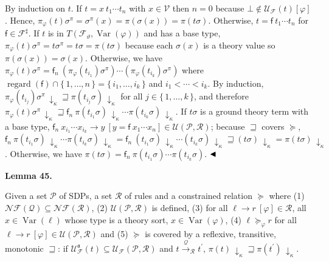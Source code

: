 \documentclass[10pt,a4paper]{amsart}
\begin{document}
By induction on $t$. If $t={x}\ {{t}_{1}\cdots{t}_{n}}$ with $x\in\mathcal{V}$ then $n=0$ because $\bot\notin\mathcal{U}_{\mathcal{F}}(t)[\varphi]$. Hence, $\pi_{\varphi}(t)\sigma^{\pi}=\sigma^{\pi}(x)=\pi(\sigma(x))=\pi(t\sigma)$. Otherwise, $t={\mathsf{f}}\ {{t}_{1}\cdots{t}_{n}}$ for $\mathsf{f}\in\mathcal{F}^{\sharp}$. If $t$ is in $T({\mathcal{F}}_{\vartheta},\operatorname{Var}(\varphi))$ and has a base type, $\pi_{\varphi}(t)\sigma^{\pi}=t\sigma^{\pi}=t\sigma=\pi(t\sigma)$ because each $\sigma(x)$ is a theory value so $\pi(\sigma(x))=\sigma(x)$. Otherwise, we have $\pi_{\varphi}(t)\sigma^{\pi}={\mathsf{f}_{n}}\ {(\pi_{\varphi}(t_{i_{1}})\sigma^{\pi})\cdots(\pi_{\varphi}(t_{i_{k}})\sigma^{\pi})}$ where $\operatorname{regard}(\mathsf{f})\cap\{\,1,\ldots,n\,\}=\{\,{i}_{1},\ldots,{i}_{k}\,\}$ and ${i}_{1}<\cdots<{i}_{k}$. By induction, $\pi_{\varphi}(t_{i_{j}})\sigma^{\pi}\,{\downarrow}_{\kappa}\sqsupseteq\pi(t_{i_{j}}\sigma)\,{\downarrow}_{\kappa}$ for all $j\in\{\,1,\ldots,k\,\}$, and therefore $\pi_{\varphi}(t)\sigma^{\pi}\,{\downarrow}_{\kappa}\sqsupseteq{\mathsf{f}_{n}}\ {\pi(t_{i_{1}}\sigma)\,{\downarrow}_{\kappa}\cdots\pi(t_{i_{k}}\sigma)\,{\downarrow}_{\kappa}}$. If $t\sigma$ is a ground theory term with a base type, ${{\mathsf{f}_{n}}\ {x_{i_{1}}\cdots x_{i_{k}}}}\rightarrow{y}\ [y={\mathsf{f}}\ {{x}_{1}\cdots{x}_{n}}]\in\mathcal{U}(\mathcal{P},\mathcal{R})$; because $\sqsupseteq$ covers $\succeq$, ${\mathsf{f}_{n}}\ {\pi(t_{i_{1}}\sigma)\,{\downarrow}_{\kappa}\cdots\pi(t_{i_{k}}\sigma)\,{\downarrow}_{\kappa}}={\mathsf{f}_{n}}\ {(t_{i_{1}}\sigma)\,{\downarrow}_{\kappa}\cdots(t_{i_{k}}\sigma)\,{\downarrow}_{\kappa}}\sqsupseteq(t\sigma)\,{\downarrow}_{\kappa}=\pi(t\sigma)\,{\downarrow}_{\kappa}$. Otherwise, we have $\pi(t\sigma)={\mathsf{f}_{n}}\ {\pi(t_{i_{1}}\sigma)\cdots\pi(t_{i_{k}}\sigma)}$. $\hfill\blacktriangleleft$\par
 
 
 
\par\medskip\noindent\textbf{Lemma 45.}\par
 
 
Given a set $\mathcal{P}$ of SDPs, a set $\mathcal{R}$ of rules and a constrained relation $\succeq$ where (1) $\mathcal{N}\!\mathcal{F}(\mathcal{Q})\subseteq\mathcal{N}\!\mathcal{F}(\mathcal{R})$, (2) $\mathcal{U}(\mathcal{P},\mathcal{R})$ is defined, (3) for all ${\ell}\rightarrow{r}\ [\varphi]\in\mathcal{R}$, all $x\in\operatorname{Var}(\ell)$ whose type is a theory sort, $x\in\operatorname{Var}(\varphi)$, (4) ${\ell}\mathrel{\succeq}_{\varphi}{r}$ for all ${\ell}\rightarrow{r}\ [\varphi]\in\mathcal{U}(\mathcal{P},\mathcal{R})$ and (5) $\succeq$ is covered by a reflexive, transitive, monotonic $\sqsupseteq$: if $\mathcal{U}_{\mathcal{F}}^{\mathfrak{a}}(t)\subseteq\mathcal{U}_{\mathcal{F}}(\mathcal{P},\mathcal{R})$ and $t\xrightarrow{\scriptscriptstyle\mathcal{Q}}_{\mathcal{R}}t^{\prime}$, $\pi(t)\,{\downarrow}_{\kappa}\sqsupseteq\pi(t^{\prime})\,{\downarrow}_{\kappa}$.\par
 
\end{document}
